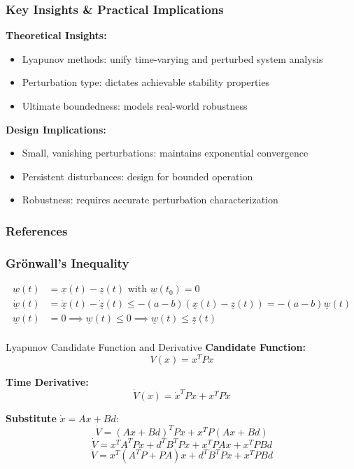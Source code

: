 \documentclass[student, noshadow, lsr, english, aspectratio=169, t]{ITR_LSR_slides}
\begin{document}
\begin{frame}
    \frametitle{Key Insights \& Practical Implications}

    \textbf{Theoretical Insights:}
    \begin{itemize}
        \setlength{\itemsep}{8pt}
        \item Lyapunov methods: unify time-varying and perturbed system analysis
        \item Perturbation type: dictates achievable stability properties
        \item Ultimate boundedness: models real-world robustness
    \end{itemize}

    \vspace{0.8cm}
    \textbf{Design Implications:}
    \begin{itemize}
        \setlength{\itemsep}{8pt}
        \item Small, vanishing perturbations: maintains exponential convergence
        \item Persistent disturbances: design for bounded operation
        \item Robustness: requires accurate perturbation characterization
    \end{itemize}
\end{frame}




\appendix

\begin{frame}
    \frametitle{References}
    \nocite{*} 
    \printbibliography[heading=none]
\end{frame}


\begin{frame}
    \frametitle{Grönwall's Inequality}
    \begin{align*}
        \underline{w}(t) &= \underline{x}(t)-\underline{z}(t) \text{ with } \underline{w}(t_0)=0\\[0.3cm]
        \dot{\underline{w}}(t) &= \dot{\underline{x}}(t)-\dot{\underline{z}}(t) \leq -(a-b)(\underline{x}(t)-\underline{z}(t)) = -(a-b)\underline{w}(t) \\[0.3cm]
        \underline{w}(t) &= 0 \implies \underline{w}(t) \leq 0 \implies \underline{w}(t) \leq \underline{z}(t) \\[0.3cm]
    \end{align*}
\end{frame}

\begin{frame}{Lyapunov Candidate Function and Derivative}
    \textbf{Candidate Function:}
    \[
    V(x) = x^T P x
    \]
    
    \textbf{Time Derivative:}
    \[
    \dot{V}(x) = \dot{x}^T P x + x^T P \dot{x}
    \]
    
    \textbf{Substitute} \( \dot{x} = A x + B d \):
    \[
    \dot{V} = (A x + B d)^T P x + x^T P (A x + B d)
    \]
    \[
    \dot{V} = x^T A^T P x + d^T B^T P x + x^T P A x + x^T P B d
    \]
    \[
    \dot{V} = x^T (A^T P + P A) x + d^T B^T P x + x^T P B d
    \]
\end{frame}
    
\end{document}
